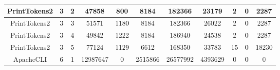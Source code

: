 \begin{table*}[]
\begin{tabular}{@{}ccccccccccc@{}}
        PrintTokens2                                             & 3                                                          & 2    & 47858                                                       & 800                                                                       & 8184                                                    & 182366                                                     & 23179                                                          & 2                                                         & 0                                                         & 2287    \\ \midrule
        PrintTokens2                                             & 3                                                          & 3    & 51571                                                       & 1180                                                                      & 8184                                                    & 182366                                                     & 26022                                                          & 2                                                         & 0                                                         & 2287    \\ \midrule
        PrintTokens2                                             & 3                                                          & 4    & 49842                                                       & 1222                                                                      & 8184                                                    & 186940                                                     & 24538                                                          & 2                                                         & 0                                                         & 2287    \\ \midrule
        PrintTokens2                                             & 3                                                          & 5    & 77124                                                       & 1129                                                                      & 6612                                                    & 168350                                                     & 33783                                                          & 15                                                        & 0                                                         & 18230   \\ \midrule
        ApacheCLI                                                & 6                                                          & 1    & 12987647                                                    & 0                                                                         & 2515866                                                 & 26577992                                                   & 4393629                                                        & 0                                                         & 0                                                         & 0       \\ \midrule

\end{tabular}
\end{table*}
